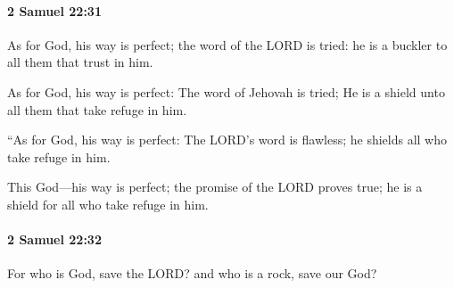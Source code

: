 		\paragraph{2 Samuel 22:31} %
			\label{2SAMUEL-22-31}

			As for God, his way is perfect; the word of the LORD is tried: he is a buckler to all them that trust in him.

			\begin{versebox}
					\item[BHS] 
					\item[ASV] As for God, his way is perfect: The word of Jehovah is tried; He is a shield unto all them that take refuge in him.
					\item[NIV] “As for God, his way is perfect: The LORD’s word is flawless; he shields all who take refuge in him.
					\item[NRSV] This God—his way is perfect; the promise of the LORD proves true; he is a shield for all who take refuge in him.
			\end{versebox}

		\paragraph{2 Samuel 22:32} %
			\label{2SAMUEL-22-32}

			For who is God, save the LORD? and who is a rock, save our God?


